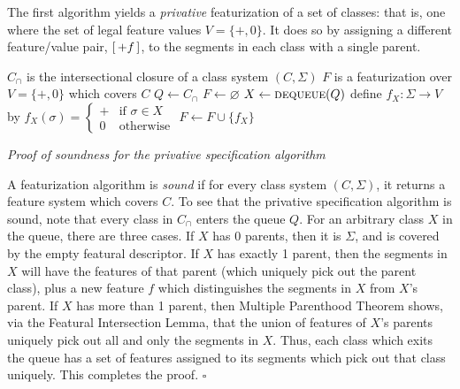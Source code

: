 \documentclass[12pt, oneside]{article}   	%
\newcommand{\featmat}[1]
{$\begin{bsmallmatrix*}[l]\text{\normalsize #1}\end{bsmallmatrix*}$}
\begin{document}
The first algorithm yields a \textit{privative} featurization of a set of classes: that is, one where the set of legal feature values $V = \{+, 0\}$. It does so by assigning a different feature/value pair, \featmat{$+f$}, to the segments in each class with a single parent.
\noindent \begin{algorithmic}
	\singlespacing
    \REQUIRE $C_\cap$ is the intersectional closure of a class system $(C, \Sigma)$
    \ENSURE $F$ is a featurization over $V = \{ +, 0 \}$ which covers $C$
    \STATE
    \STATE $Q \leftarrow C_\cap$
    \STATE $F \leftarrow \varnothing$
    \STATE
        \STATE $X \leftarrow \textsc{dequeue}(Q)$
            \STATE define $f_X : \Sigma \rightarrow V$ by $f_X(\sigma) = \begin{cases}
                + & \mbox{if } \sigma \in X \\
                0 & \mbox{otherwise}
                \end{cases} $
            \STATE $F \leftarrow F \cup \{f_X\}$
        \ENDIF
    \ENDWHILE
\end{algorithmic}
\doublespacing

\noindent \textit{Proof of soundness for the privative specification algorithm}

A featurization algorithm is \textit{sound} if for every class system $(C, \Sigma)$, it returns a feature system which covers $C$. To see that the privative specification algorithm is sound, note that every class in $C_\cap$ enters the queue $Q$. For an arbitrary class $X$ in the queue, there are three cases. If $X$ has 0 parents, then it is $\Sigma$, and is covered by the empty featural descriptor. If $X$ has exactly 1 parent, then the segments in $X$ will have the features of that parent (which uniquely pick out the parent class), plus a new feature $f$ which distinguishes the segments in $X$ from $X$'s parent. If $X$ has more than 1 parent, then Multiple Parenthood Theorem shows, via the Featural Intersection Lemma, that the union of features of $X$'s parents uniquely pick out all and only the segments in $X$. Thus, each class which exits the queue has a set of features assigned to its segments which pick out that class uniquely. This completes the proof. $\square$
\end{document}
